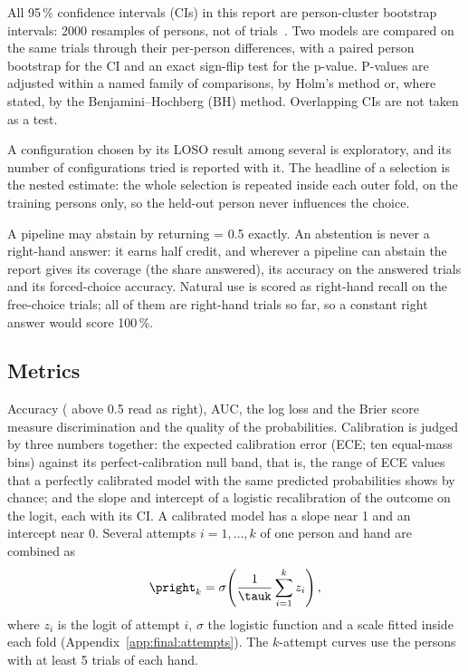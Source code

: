 All 95\,\% confidence intervals (CIs) in this report are person-cluster bootstrap intervals: 2000 resamples of
persons, not of trials~\cite{saravanan2020bootstrap}. Two models are compared on the same trials through their
per-person differences, with a paired person bootstrap for the CI and an exact sign-flip test for the p-value.
P-values are adjusted within a named family of comparisons, by Holm's method or, where stated, by the
Benjamini--Hochberg (BH) method. Overlapping CIs are not taken as a test.

A configuration chosen by its LOSO result among several is exploratory, and its number of configurations tried is
reported with it. The headline of a selection is the nested estimate: the whole selection is repeated inside each
outer fold, on the training persons only, so the held-out person never influences the choice.

A pipeline may abstain by returning \pright{} = 0.5 exactly. An abstention is never a right-hand answer: it earns half
credit, and wherever a pipeline can abstain the report gives its coverage (the share answered), its accuracy on the
answered trials and its forced-choice accuracy. Natural use is scored as right-hand recall on the free-choice
trials; all of them are right-hand trials so far, so a constant right answer would score 100\,\%.

\subsection{Metrics}\label{sec:methods:metrics}
Accuracy (\pright{} above 0.5 read as right), AUC, the log loss and the Brier score~\cite{brier1950verification}
measure discrimination and the quality of the probabilities. Calibration is judged by three numbers together: the
expected calibration error (ECE; ten equal-mass bins) against its perfect-calibration null band, that is, the range
of ECE values that a perfectly calibrated model with the same predicted probabilities shows by chance; and the
slope and intercept of a logistic recalibration of the outcome on the logit, each with its CI. A calibrated model
has a slope near 1 and an intercept near 0. Several attempts $i = 1, \dots, k$ of one person and hand are combined
as
\begin{equation}
  \pright_k = \sigma\!\left(\frac{1}{\tauk}\sum_{i=1}^{k} z_i\right),
  \label{eq:aggregate}
\end{equation}
where $z_i$ is the logit of attempt $i$, $\sigma$ the logistic function and \tauk{} a scale fitted inside each fold
(Appendix~\ref{app:final:attempts}). The $k$-attempt curves use the  persons with at least 5
trials of each hand.

